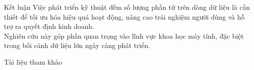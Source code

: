 \documentclass[10pt]{beamer}
\newcommand{\themename}{\textbf{\textsc{metropolis}}\xspace}
\begin{document}
\begin{frame}{Kết luận}
  Việc phát triển kỹ thuật đếm số lượng phần tử trên dòng dữ liệu là cần thiết để tối ưu hóa hiệu quả hoạt động, nâng cao trải nghiệm người dùng và hỗ trợ ra quyết định kinh doanh.\\ 
  Nghiên cứu này góp phần quan trọng vào lĩnh vực khoa học máy tính, đặc biệt trong bối cảnh dữ liệu lớn ngày càng phát triển.
\end{frame}







\begin{frame}[allowframebreaks]{Tài liệu tham khảo}
  
  
\end{frame}
\end{document}
